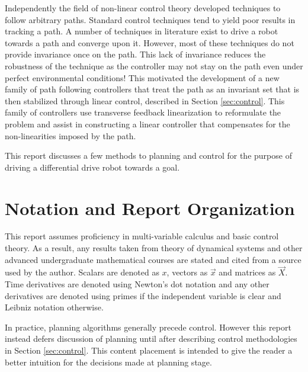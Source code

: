 \documentclass[oneside, 11pt]{book}
\begin{document}
Independently the field of non-linear control theory developed techniques to follow arbitrary paths. Standard control techniques tend to yield poor results in tracking a path. A number of techniques in literature exist to drive a robot towards a path and converge upon it. However, most of these techniques do not provide invariance once on the path\cite{Gill15}. This lack of invariance reduces the robustness of the technique as the controller may not stay on the path even under perfect environmental conditions! This motivated the development of a new family of path following controllers that treat the path as an invariant set that is then stabilized through linear control, described in Section \ref{sec:control}. This family of controllers use transverse feedback linearization to reformulate the problem and assist in constructing a linear controller that compensates for the non-linearities imposed by the path.

This report discusses a few methods to planning and control for the purpose of driving a differential drive robot towards a goal.

\section{Notation and Report Organization}
This report assumes proficiency in multi-variable calculus and basic control theory. As a result, any results taken from theory of dynamical systems and other advanced undergraduate mathematical courses are stated and cited from a source used by the author. Scalars are denoted as $x$, vectors as $\vec{x}$ and matrices as $\vec{X}$. Time derivatives are denoted using Newton's dot notation and any other derivatives are denoted using primes if the independent variable is clear and Leibniz notation otherwise.

In practice, planning algorithms generally precede control. However this report instead defers discussion of planning until after describing control methodologies in Section \ref{sec:control}. This content placement is intended to give the reader a better intuition for the decisions made at planning stage.
\end{document}
